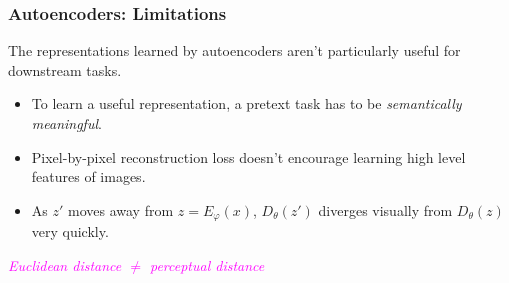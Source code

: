 \documentclass[xcolor={dvipsnames}]{beamer}
\renewcommand{\phi}{\varphi}
\newcommand{\df}[1]{\textcolor{BrickRed}{\emph{#1}}}
\renewcommand{\th}[1]{\textcolor{Fuchsia}{\emph{#1}}}
\newcommand{\cX}{\mathcal{X}}
\newcommand{\cZ}{\mathcal{Z}}
\begin{document}
\begin{frame}
    \frametitle{Autoencoders: Limitations}
    \setlength\parskip{1em}

    The representations learned by autoencoders aren't particularly useful for downstream tasks.

\begin{itemize}
    \setlength\itemsep{1em}
    \item To learn a useful representation, a pretext task has to be \df{semantically meaningful}.

    \item Pixel-by-pixel reconstruction loss doesn't encourage learning high level features of images.
    
    \item As $z'$ moves away from $z=E_\phi(x)$, $D_\theta(z')$ diverges visually from $D_\theta(z)$ very quickly.

\end{itemize}    

    \begin{center}
        \th{Euclidean distance $\neq$ perceptual distance}
    \end{center}

\end{frame}
\end{document}
